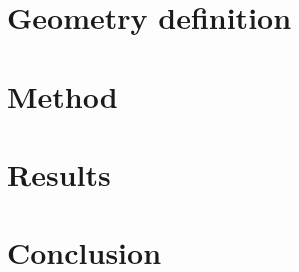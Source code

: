 \documentclass[a4paper]{article}
\begin{document}
\section{Geometry definition}

\section{Method}

\section{Results}

\section{Conclusion}
\end{document}

